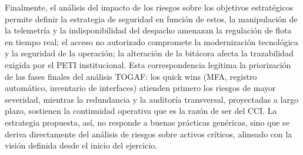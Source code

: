 Finalmente, el análisis del impacto de los riesgos sobre los objetivos estratégicos permite definir la estrategia de seguridad en función de estos, la manipulación de la telemetría y la indisponibilidad del despacho amenazan la regulación de flota en tiempo real; el acceso no autorizado compromete la modernización tecnológica y la seguridad de la operación; la alteración de la bitácora afecta la trazabilidad exigida por el PETI institucional. Esta correspondencia legitima la priorización de las fases finales del análisis TOGAF: los quick wins (MFA, registro automático, inventario de interfaces) atienden primero los riesgos de mayor severidad, mientras la redundancia y la auditoría transversal, proyectadas a largo plazo, sostienen la continuidad operativa que es la razón de ser del CCI. La estrategia propuesta, así, no responde a buenas prácticas genéricas, sino que se deriva directamente del análisis de riesgos sobre activos críticos, alineado con la visión definida desde el inicio del ejercicio.